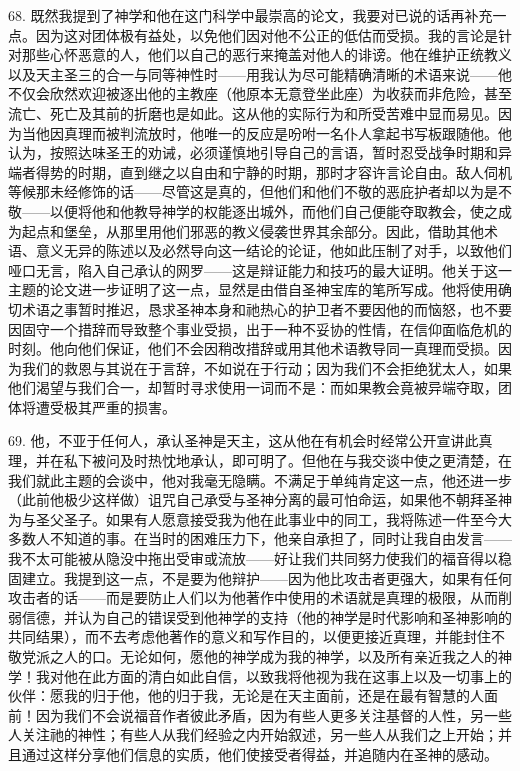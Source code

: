 68. 既然我提到了神学和他在这门科学中最崇高的论文，我要对已说的话再补充一点。因为这对团体极有益处，以免他们因对他不公正的低估而受损。我的言论是针对那些心怀恶意的人，他们以自己的恶行来掩盖对他人的诽谤。他在维护正统教义以及天主圣三的合一与同等神性时——用我认为尽可能精确清晰的术语来说——他不仅会欣然欢迎被逐出他的主教座（他原本无意登坐此座）为收获而非危险，甚至流亡、死亡及其前的折磨也是如此。这从他的实际行为和所受苦难中显而易见。因为当他因真理而被判流放时，他唯一的反应是吩咐一名仆人拿起书写板跟随他。他认为，按照达味圣王的劝诫，必须谨慎地引导自己的言语，暂时忍受战争时期和异端者得势的时期，直到继之以自由和宁静的时期，那时才容许言论自由。敌人伺机等候那未经修饰的话——尽管这是真的，但他们和他们不敬的恶庇护者却以为是不敬——以便将他和他教导神学的权能逐出城外，而他们自己便能夺取教会，使之成为起点和堡垒，从那里用他们邪恶的教义侵袭世界其余部分。因此，借助其他术语、意义无异的陈述以及必然导向这一结论的论证，他如此压制了对手，以致他们哑口无言，陷入自己承认的网罗——这是辩证能力和技巧的最大证明。他关于这一主题的论文进一步证明了这一点，显然是由借自圣神宝库的笔所写成。他将使用确切术语之事暂时推迟，恳求圣神本身和祂热心的护卫者不要因他的而恼怒，也不要因固守一个措辞而导致整个事业受损，出于一种不妥协的性情，在信仰面临危机的时刻。他向他们保证，他们不会因稍改措辞或用其他术语教导同一真理而受损。因为我们的救恩与其说在于言辞，不如说在于行动；因为我们不会拒绝犹太人，如果他们渴望与我们合一，却暂时寻求使用一词而不是：而如果教会竟被异端夺取，团体将遭受极其严重的损害。\par

69. 他，不亚于任何人，承认圣神是天主，这从他在有机会时经常公开宣讲此真理，并在私下被问及时热忱地承认，即可明了。但他在与我交谈中使之更清楚，在我们就此主题的会谈中，他对我毫无隐瞒。不满足于单纯肯定这一点，他还进一步（此前他极少这样做）诅咒自己承受与圣神分离的最可怕命运，如果他不朝拜圣神为与圣父圣子。如果有人愿意接受我为他在此事业中的同工，我将陈述一件至今大多数人不知道的事。在当时的困难压力下，他亲自承担了，同时让我自由发言——我不太可能被从隐没中拖出受审或流放——好让我们共同努力使我们的福音得以稳固建立。我提到这一点，不是要为他辩护——因为他比攻击者更强大，如果有任何攻击者的话——而是要防止人们以为他著作中使用的术语就是真理的极限，从而削弱信德，并认为自己的错误受到他神学的支持（他的神学是时代影响和圣神影响的共同结果），而不去考虑他著作的意义和写作目的，以便更接近真理，并能封住不敬党派之人的口。无论如何，愿他的神学成为我的神学，以及所有亲近我之人的神学！我对他在此方面的清白如此自信，以致我将他视为我在这事上以及一切事上的伙伴：愿我的归于他，他的归于我，无论是在天主面前，还是在最有智慧的人面前！因为我们不会说福音作者彼此矛盾，因为有些人更多关注基督的人性，另一些人关注祂的神性；有些人从我们经验之内开始叙述，另一些人从我们之上开始；并且通过这样分享他们信息的实质，他们使接受者得益，并追随内在圣神的感动。\par

